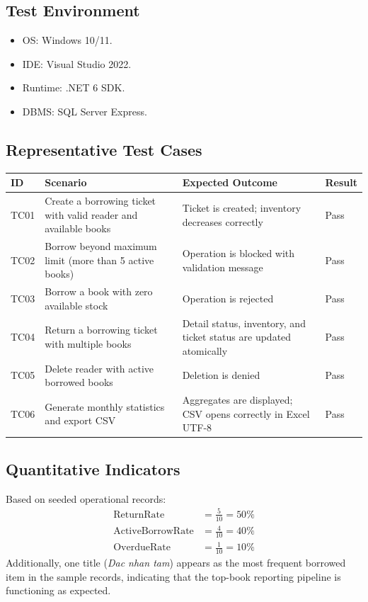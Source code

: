 \documentclass[12pt,a4paper]{article}
\begin{document}
\subsection{Test Environment}
\begin{itemize}[leftmargin=1.5cm]
    \item OS: Windows 10/11.
    \item IDE: Visual Studio 2022.
    \item Runtime: .NET 6 SDK.
    \item DBMS: SQL Server Express.
\end{itemize}

\subsection{Representative Test Cases}
\begin{longtable}{p{1.2cm}p{6.0cm}p{5.4cm}p{2.0cm}}
\toprule
\textbf{ID} & \textbf{Scenario} & \textbf{Expected Outcome} & \textbf{Result} \\
\midrule
\endhead
TC01 & Create a borrowing ticket with valid reader and available books & Ticket is created; inventory decreases correctly & Pass \\
TC02 & Borrow beyond maximum limit (more than 5 active books) & Operation is blocked with validation message & Pass \\
TC03 & Borrow a book with zero available stock & Operation is rejected & Pass \\
TC04 & Return a borrowing ticket with multiple books & Detail status, inventory, and ticket status are updated atomically & Pass \\
TC05 & Delete reader with active borrowed books & Deletion is denied & Pass \\
TC06 & Generate monthly statistics and export CSV & Aggregates are displayed; CSV opens correctly in Excel UTF-8 & Pass \\
\bottomrule
\end{longtable}

\subsection{Quantitative Indicators}
Based on seeded operational records:
\begin{align}
    \text{ReturnRate} &= \frac{5}{10} = 50\% \\
    \text{ActiveBorrowRate} &= \frac{4}{10} = 40\% \\
    \text{OverdueRate} &= \frac{1}{10} = 10\%
\end{align}
Additionally, one title (\textit{Dac nhan tam}) appears as the most frequent borrowed item in the sample records, indicating that the top-book reporting pipeline is functioning as expected.
\end{document}
